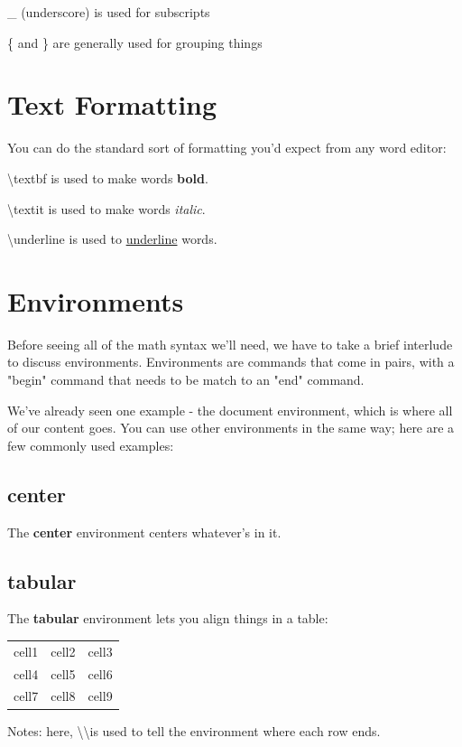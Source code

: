 \documentclass{article}
\begin{document}
\_ (underscore) is used for subscripts 

\{ and \} are generally used for grouping things

\section{Text Formatting}

You can do the standard sort of formatting you'd expect from any word editor:

\textbackslash textbf{} is used to make words \textbf{bold}.

\textbackslash textit{} is used to make words \textit{italic}.

\textbackslash underline{} is used to \underline{underline} words.

\section{Environments}
Before seeing all of the math syntax we'll need, we have to take a brief interlude to discuss environments. Environments are commands that come in pairs, with a "begin" command that needs to be match to an "end" command.

We've already seen one example - the document environment, which is where all of our content goes. You can use other environments in the same way; here are a few commonly used examples:

\subsection{center}
\begin{center}
    The \textbf{center} environment centers whatever's in it.
\end{center}

\subsection{tabular}
The \textbf{tabular} environment lets you align things in a table:
\begin{tabular}{ c c c } 
  cell1 & cell2 & cell3 \\ 
  cell4 & cell5 & cell6 \\ 
  cell7 & cell8 & cell9 \\ 
\end{tabular}

Notes: here, \textbackslash\textbackslash is used to tell the environment where each row ends.
\end{document}
